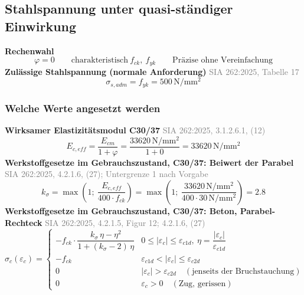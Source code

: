 \documentclass[11pt,a4paper]{article}
\newcommand{\normref}[1]{{\small\textcolor{gray}{#1}}}
\begin{document}
\subsection{Stahlspannung unter quasi-ständiger Einwirkung}
\noindent\textbf{Rechenwahl}
\begin{equation*}
\varphi = 0 \qquad \text{charakteristisch}\ f_{ck},\ f_{yk} \qquad \text{Präzise ohne Vereinfachung}
\end{equation*}
\noindent\textbf{Zulässige Stahlspannung (normale Anforderung)} \hfill \normref{SIA 262:2025, Tabelle 17}
\begin{equation*}
\sigma_{s,adm} = f_{yk} = 500\,\mathrm{N}/\mathrm{mm}^{2}
\end{equation*}
\subsubsection{Welche Werte angesetzt werden}
\noindent\textbf{Wirksamer Elastizitätsmodul C30/37} \hfill \normref{SIA 262:2025, 3.1.2.6.1, (12)}
\begin{equation*}
E_{c,eff} = \frac{E_{cm}}{1 + \varphi} = \frac{33620\,\mathrm{N}/\mathrm{mm}^{2}}{1 + 0} = 33620\,\mathrm{N}/\mathrm{mm}^{2}
\end{equation*}
\noindent\textbf{Werkstoffgesetze im Gebrauchszustand, C30/37: Beiwert der Parabel} \hfill \normref{SIA 262:2025, 4.2.1.6, (27); Untergrenze 1 nach Vorgabe}
\begin{equation*}
k_{\sigma} = \max\left(1;\ \frac{E_{c,eff}}{400 \cdot f_{ck}}\right) = \max\left(1;\ \frac{33620\,\mathrm{N}/\mathrm{mm}^{2}}{400 \cdot 30\,\mathrm{N}/\mathrm{mm}^{2}}\right) = 2.8
\end{equation*}
\noindent\textbf{Werkstoffgesetze im Gebrauchszustand, C30/37: Beton, Parabel-Rechteck} \hfill \normref{SIA 262:2025, 4.2.1.5, Figur 12; 4.2.1.6, (27)}
\begin{equation*}
\sigma_c(\varepsilon_c) = \begin{cases} -f_{ck} \cdot \dfrac{k_\sigma\,\eta - \eta^2}{1 + (k_\sigma - 2)\,\eta} & 0 \le |\varepsilon_c| \le \varepsilon_{c1d},\ \eta = \dfrac{|\varepsilon_c|}{\varepsilon_{c1d}} \\[2ex] -f_{ck} & \varepsilon_{c1d} < |\varepsilon_c| \le \varepsilon_{c2d} \\[1ex] 0 & |\varepsilon_c| > \varepsilon_{c2d} \quad (\text{jenseits der Bruchstauchung}) \\[1ex] 0 & \varepsilon_c > 0 \quad (\text{Zug, gerissen}) \end{cases}
\end{equation*}
\end{document}
